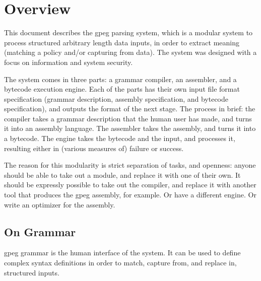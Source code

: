 \section{Overview}

This document describes the gpeg parsing system, which is a 
modular system to process structured arbitrary length data inputs,
in order to extract meaning (matching a policy and/or capturing from data).
The system was designed with a focus on information and system security.

The system comes in three parts: a grammar compiler, an assembler,
and a bytecode execution engine. Each of the parts has their own
input file format specification (grammar description, assembly specification,
and bytecode specification), and outputs the format of the next stage.
The process in brief: the compiler takes a
grammar description that the human user has made, and turns it into
an assembly language. The assembler takes the assembly, and turns it
into a bytecode. The engine takes the bytecode and the input, and
processes it, resulting either in (various measures of) failure or
success.




The reason for this modularity is strict separation of tasks, and openness:
anyone should be able to take out a module, and replace it with one
of their own.
It should be expressly possible to take out the compiler, and replace
it with another tool that produces the gpeg assembly, for example.
Or have a different engine. Or write an optimizer for the assembly.

\subsection{On Grammar}
  
gpeg grammar is the human interface of the system.
It can be used to define complex syntax definitions in order
to match, capture from, and replace in, structured inputs.

